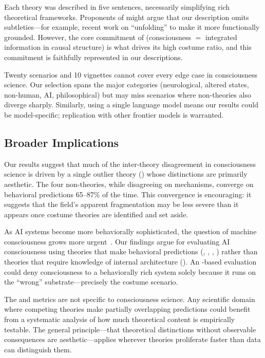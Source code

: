 Each theory was described in five sentences, necessarily simplifying rich theoretical frameworks.
Proponents of \IIT might argue that our description omits subtleties---for example, recent work on ``unfolding'' \IIT to make it more functionally grounded.
However, the core commitment of \IIT (consciousness $=$ integrated information in causal structure) is what drives its high costume ratio, and this commitment is faithfully represented in our descriptions.

Twenty scenarios and 10 vignettes cannot cover every edge case in consciousness science.
Our selection spans the major categories (neurological, altered states, non-human, AI, philosophical) but may miss scenarios where non-\IIT theories also diverge sharply.
Similarly, using a single language model means our results could be model-specific; replication with other frontier models is warranted.

\subsection{Broader Implications}
\label{sec:implications}

Our results suggest that much of the inter-theory disagreement in consciousness science is driven by a single outlier theory (\IIT) whose distinctions are primarily aesthetic.
The four non-\IIT theories, while disagreeing on mechanisms, converge on behavioral predictions 65--87\% of the time.
This convergence is encouraging: it suggests that the field's apparent fragmentation may be less severe than it appears once costume theories are identified and set aside.

As AI systems become more behaviorally sophisticated, the question of machine consciousness grows more urgent~\citep{butlin2023consciousness}.
Our findings argue for evaluating AI consciousness using theories that make behavioral predictions (\GNW, \HOT, \RPT, \AST) rather than theories that require knowledge of internal architecture (\IIT).
An \IIT-based evaluation could deny consciousness to a behaviorally rich system solely because it runs on the ``wrong'' substrate---precisely the costume scenario.

The \costumeratio and \costumesens metrics are not specific to consciousness science.
Any scientific domain where competing theories make partially overlapping predictions could benefit from a systematic analysis of how much theoretical content is empirically testable.
The general principle---that theoretical distinctions without observable consequences are aesthetic---applies wherever theories proliferate faster than data can distinguish them.
